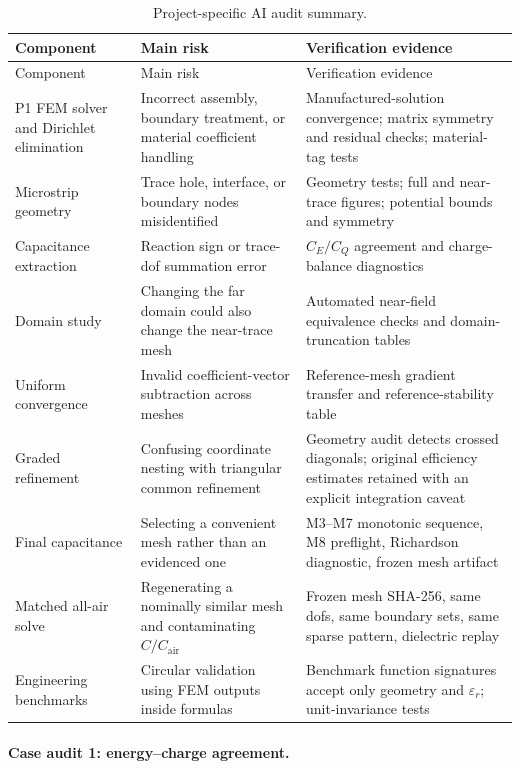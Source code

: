 \documentclass[11pt]{article}
\newcommand{\epsr}{\varepsilon_r}
\newcommand{\Cair}{C_{\mathrm{air}}}
\begin{document}
\begin{longtable}{@{}L{0.22\textwidth}L{0.32\textwidth}L{0.36\textwidth}@{}}
\caption{Project-specific AI audit summary.}\label{tab:aiaudit}\\
\toprule
Component & Main risk & Verification evidence\\
\midrule
\endfirsthead
\toprule
Component & Main risk & Verification evidence\\
\midrule
\endhead
P1 FEM solver and Dirichlet elimination & Incorrect assembly, boundary treatment, or material coefficient handling & Manufactured-solution convergence; matrix symmetry and residual checks; material-tag tests\\
Microstrip geometry & Trace hole, interface, or boundary nodes misidentified & Geometry tests; full and near-trace figures; potential bounds and symmetry\\
Capacitance extraction & Reaction sign or trace-dof summation error & $C_E/C_Q$ agreement and charge-balance diagnostics\\
Domain study & Changing the far domain could also change the near-trace mesh & Automated near-field equivalence checks and domain-truncation tables\\
Uniform convergence & Invalid coefficient-vector subtraction across meshes & Reference-mesh gradient transfer and reference-stability table\\
Graded refinement & Confusing coordinate nesting with triangular common refinement & Geometry audit detects crossed diagonals; original efficiency estimates retained with an explicit integration caveat\\
Final capacitance & Selecting a convenient mesh rather than an evidenced one & M3--M7 monotonic sequence, M8 preflight, Richardson diagnostic, frozen mesh artifact\\
Matched all-air solve & Regenerating a nominally similar mesh and contaminating $C/\Cair$ & Frozen mesh SHA-256, same dofs, same boundary sets, same sparse pattern, dielectric replay\\
Engineering benchmarks & Circular validation using FEM outputs inside formulas & Benchmark function signatures accept only geometry and $\epsr$; unit-invariance tests\\
\bottomrule
\end{longtable}

\paragraph{Case audit 1: energy--charge agreement.}
\end{document}

